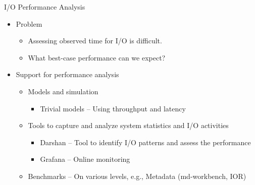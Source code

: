 \documentclass[compress,11pt,xcolor=svgnames,aspectratio=169]{beamer}
\begin{document}
\begin{frame}[fragile]{I/O Performance Analysis}

\begin{itemize}
\setlength\itemsep{0.3cm}

  \item Problem

    \begin{itemize}
    \item Assessing observed time for I/O is difficult.
    \item What best-case performance can we expect?
    \end{itemize}

  \item Support for performance analysis
  \setlength\itemsep{0.4cm}

    \begin{itemize}

    \item Models and simulation

      \begin{itemize}
        \item Trivial models -- Using throughput and latency
      \end{itemize}

    \item Tools to capture and analyze system statistics and I/O activities

      \begin{itemize}
        \item Darshan -- Tool to identify I/O patterns and assess the performance
        \item Grafana -- Online monitoring
      \end{itemize}

    \item Benchmarks -- On various levels, e.g., Metadata (md-workbench, IOR)

    \end{itemize}

\end{itemize}

\end{frame}
\end{document}
